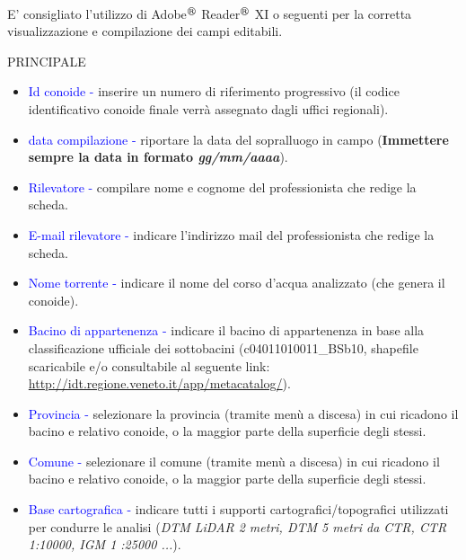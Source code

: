 \documentclass[12pt,a4paper]{article}
\begin{document}
\normalsize
{}\\\vskip 10mm
\begin{flushleft}
\normalsize
E' consigliato l'utilizzo di Adobe$^{\tiny\circledR}$ Reader$^{\tiny\circledR}$ XI o seguenti per la corretta visualizzazione  e compilazione dei campi editabili.\vskip 5mm

\small

PRINCIPALE\\

\begin{itemize}
\item{\textcolor{blue}{Id conoide - }} inserire un numero di riferimento progressivo (il codice identificativo conoide finale verrà assegnato dagli uffici regionali).
\item{\textcolor{blue}{data compilazione - }} riportare la data del sopralluogo in campo (\textbf{Immettere sempre la data in formato \textit{gg/mm/aaaa}}).
\item{\textcolor{blue}{Rilevatore - }} compilare nome e cognome del professionista che redige la scheda.
\item{\textcolor{blue}{E-mail rilevatore - }} indicare l'indirizzo mail del professionista che redige la scheda.
\item{\textcolor{blue}{Nome torrente - }} indicare il nome del corso d'acqua analizzato (che genera il conoide).
\item{\textcolor{blue}{Bacino di appartenenza - }} indicare il bacino di appartenenza in base alla classificazione ufficiale dei sottobacini (c04011010011\_BSb10, shapefile scaricabile e/o consultabile al seguente link: \url{http://idt.regione.veneto.it/app/metacatalog/}).
\item{\textcolor{blue}{Provincia - }} selezionare la provincia (tramite menù a discesa) in cui ricadono il bacino e relativo conoide, o la maggior parte della superficie degli stessi.
\item{\textcolor{blue}{Comune - }} selezionare il comune (tramite menù a discesa) in cui ricadono il bacino e relativo conoide, o la maggior parte della superficie degli stessi.
\item{\textcolor{blue}{Base cartografica - }} indicare tutti i supporti cartografici/topografici utilizzati per condurre le analisi (\textit{DTM LiDAR 2 metri, DTM 5 metri da CTR, CTR 1:10000, IGM 1 :25000 ...}).
\end{itemize}



\end{flushleft}
\end{document}
